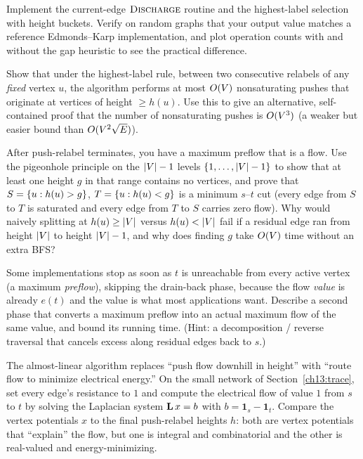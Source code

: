 \begin{exercise}
Implement the current-edge $\textsc{Discharge}$ routine and the highest-label selection with height buckets. Verify on random graphs that your output value matches a reference Edmonds--Karp implementation, and plot operation counts with and without the gap heuristic to see the practical difference.
\end{exercise}

\begin{exercise}
Show that under the highest-label rule, between two consecutive relabels of any \emph{fixed} vertex $u$, the algorithm performs at most $O(V)$ nonsaturating pushes that originate at vertices of height $\ge h(u)$. Use this to give an alternative, self-contained proof that the number of nonsaturating pushes is $O(V^3)$ (a weaker but easier bound than $O(V^2\sqrt E)$).
\end{exercise}

\begin{exercise}
After push-relabel terminates, you have a maximum preflow that is a flow. Use the pigeonhole principle on the $\lvert V\rvert-1$ levels $\{1,\dots,\lvert V\rvert-1\}$ to show that at least one height $g$ in that range contains no vertices, and prove that $S=\{u:h(u)>g\}$, $T=\{u:h(u)<g\}$ is a minimum $s$--$t$ cut (every edge from $S$ to $T$ is saturated and every edge from $T$ to $S$ carries zero flow). Why would naively splitting at $h(u)\ge\lvert V\rvert$ versus $h(u)<\lvert V\rvert$ fail if a residual edge ran from height $\lvert V\rvert$ to height $\lvert V\rvert-1$, and why does finding $g$ take $O(V)$ time without an extra BFS?
\end{exercise}

\begin{exercise}
Some implementations stop as soon as $t$ is unreachable from every active vertex (a maximum \emph{preflow}), skipping the drain-back phase, because the flow \emph{value} is already $e(t)$ and the value is what most applications want. Describe a second phase that converts a maximum preflow into an actual maximum flow of the same value, and bound its running time. (Hint: a decomposition / reverse traversal that cancels excess along residual edges back to $s$.)
\end{exercise}

\begin{exercise}
The almost-linear algorithm replaces ``push flow downhill in height'' with ``route flow to minimize electrical energy.'' On the small network of Section~\ref{ch13:trace}, set every edge's resistance to $1$ and compute the electrical flow of value $1$ from $s$ to $t$ by solving the Laplacian system $\mathbf{L}\, x=b$ with $b=\mathbf{1}_s-\mathbf{1}_t$. Compare the vertex potentials $x$ to the final push-relabel heights $h$: both are vertex potentials that ``explain'' the flow, but one is integral and combinatorial and the other is real-valued and energy-minimizing.
\end{exercise}

